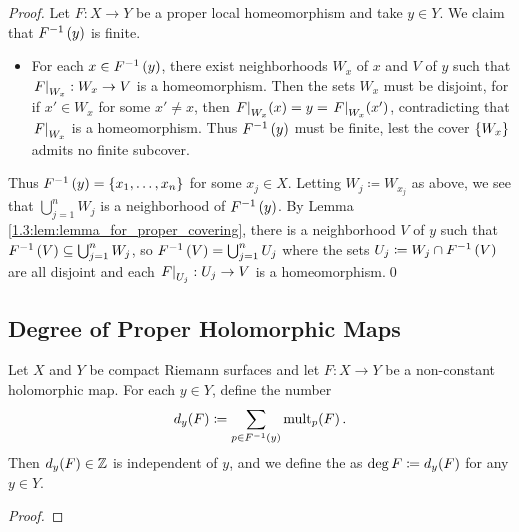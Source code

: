 \documentclass[../Moduli_Spaces_of_Riemann_Surfaces.tex]{subfiles}
\begin{document}
    \begin{proof}
        Let $F:X\to Y$ be a proper local homeomorphism and take $y\in Y$. We claim that $F^{-1}\left(y\right)$ is finite.
        \begin{itemize}
            \item For each $x\in F^{-1}\left(y\right)$, there exist neighborhoods $W_x$ of $x$ and $V$ of $y$ such that $\left.F\right|_{W_x}:W_x\to V$ is a homeomorphism. Then the sets $W_x$ must be disjoint, for if $x'\in W_x$ for some $x'\neq x$, then $\left.F\right|_{W_x}\!\left(x\right)=y=\left.F\right|_{W_x}\!\left(x'\right)$, contradicting that $\left.F\right|_{W_x}$ is a homeomorphism. Thus $F^{-1}\left(y\right)$ must be finite, lest the cover $\left\{W_x\right\}$ admits no finite subcover.
        \end{itemize}
        Thus $F^{-1}\left(y\right)=\left\{x_1,\dots,x_n\right\}$ for some $x_j\in X$. Letting $W_j\coloneqq W_{x_j}$ as above, we see that $\bigcup_{j=1}^{n}W_j$ is a neighborhood of $F^{-1}\left(y\right)$. By Lemma \ref{1.3:lem:lemma_for_proper_covering}, there is a neighborhood $V$ of $y$ such that $F^{-1}\left(V\right)\subseteq\bigcup_{j=1}^{n}W_j$, so $F^{-1}\left(V\right)=\bigcup_{j=1}^{n}U_j$ where the sets $U_j\coloneqq W_j\cap F^{-1}\left(V\right)$ are all disjoint and each $\left.F\right|_{U_j}:U_j\to V$ is a homeomorphism.\qed
    \end{proof}
    \subsection{Degree of Proper Holomorphic Maps}\label{1.3}
    \begin{defthm}
        Let $X$ and $Y$ be compact Riemann surfaces and let $F:X\to Y$ be a non-constant holomorphic map. For each $y\in Y$, define the number
        \begin{equation*}
            d_y\!\left(F\right)\coloneqq\sum_{p\in F^{-1}\left(y\right)}\operatorname{mult}_p\!\left(F\right).
        \end{equation*}
        Then $d_y\!\left(F\right)\in\mathbb{Z}$ is independent of $y$, and we define the  as $\deg F\coloneqq d_y\!\left(F\right)$ for any $y\in Y$.
    \end{defthm}
    \begin{proof}
        
    \end{proof}
\end{document}
